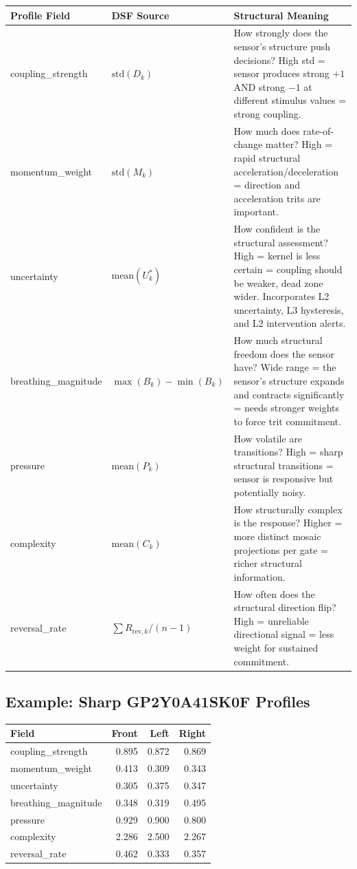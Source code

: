 \documentclass[11pt,a4paper]{article}
\begin{document}
\begin{center}
\begin{tabular}{@{}llp{7cm}@{}}
\toprule
\textbf{Profile Field} & \textbf{DSF Source} & \textbf{Structural Meaning} \\
\midrule
coupling\_strength & $\text{std}(D_k)$ & How strongly does the sensor's structure push decisions? High std = sensor produces strong $+1$ AND strong $-1$ at different stimulus values = strong coupling. \\
\addlinespace
momentum\_weight & $\text{std}(M_k)$ & How much does rate-of-change matter? High = rapid structural acceleration/deceleration = direction and acceleration trits are important. \\
\addlinespace
uncertainty & $\text{mean}(U^*_k)$ & How confident is the structural assessment? High = kernel is less certain = coupling should be weaker, dead zone wider. Incorporates L2 uncertainty, L3 hysteresis, and L2 intervention alerts. \\
\addlinespace
breathing\_magnitude & $\max(B_k) - \min(B_k)$ & How much structural freedom does the sensor have? Wide range = the sensor's structure expands and contracts significantly = needs stronger weights to force trit commitment. \\
\addlinespace
pressure & $\text{mean}(P_k)$ & How volatile are transitions? High = sharp structural transitions = sensor is responsive but potentially noisy. \\
\addlinespace
complexity & $\text{mean}(C_k)$ & How structurally complex is the response? Higher = more distinct mosaic projections per gate = richer structural information. \\
\addlinespace
reversal\_rate & $\sum R_{\text{rev},k} / (n-1)$ & How often does the structural direction flip? High = unreliable directional signal = less weight for sustained commitment. \\
\bottomrule
\end{tabular}
\end{center}

\subsection{Example: Sharp GP2Y0A41SK0F Profiles}

\begin{center}
\begin{tabular}{@{}lrrr@{}}
\toprule
\textbf{Field} & \textbf{Front} & \textbf{Left} & \textbf{Right} \\
\midrule
coupling\_strength & 0.895 & 0.872 & 0.869 \\
momentum\_weight & 0.413 & 0.309 & 0.343 \\
uncertainty & 0.305 & 0.375 & 0.347 \\
breathing\_magnitude & 0.348 & 0.319 & 0.495 \\
pressure & 0.929 & 0.900 & 0.800 \\
complexity & 2.286 & 2.500 & 2.267 \\
reversal\_rate & 0.462 & 0.333 & 0.357 \\
\bottomrule
\end{tabular}
\end{center}
\end{document}
